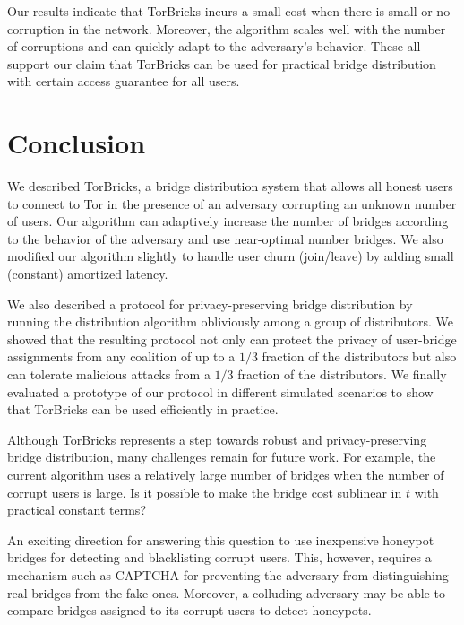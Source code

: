 \documentclass{sig-alternate-05-2015}
\newcommand{\bricks}{}
\def\bricks/{\mbox{TorBricks}}
\begin{document}
Our results indicate that \bricks/ incurs a small cost when there is small or no corruption in the network. Moreover, the algorithm scales well with the number of corruptions and can quickly adapt to the adversary's behavior. These all support our claim that \bricks/ can be used for practical bridge distribution with certain access guarantee for all users.

\section{Conclusion} \label{sec:conclusion}
We described \bricks/, a bridge distribution system that allows all honest users to connect to Tor in the presence of an adversary corrupting an unknown number of users. Our algorithm can adaptively increase the number of bridges according to the behavior of the adversary and use near-optimal number bridges. We also modified our algorithm slightly to handle user churn (join/leave) by adding small (constant) amortized latency.

We also described a protocol for privacy-preserving bridge distribution by running the distribution algorithm obliviously among a group of distributors. We showed that the resulting protocol not only can protect the privacy of user-bridge assignments from any coalition of up to a $1/3$ fraction of the distributors but also can tolerate malicious attacks from a $1/3$ fraction of the distributors. We finally evaluated a prototype of our protocol in different simulated scenarios to show that \bricks/ can be used efficiently in practice.

Although \bricks/ represents a step towards robust and privacy-preserving bridge distribution, many challenges remain for future work. For example, the current algorithm uses a relatively large number of bridges when the number of corrupt users is large. Is it possible to make the bridge cost sublinear in $t$ with practical constant terms? 

An exciting direction for answering this question to use inexpensive honeypot bridges for detecting and blacklisting corrupt users. This, however, requires a mechanism such as CAPTCHA for preventing the adversary from distinguishing real bridges from the fake ones. Moreover, a colluding adversary may be able to compare bridges assigned to its corrupt users to detect honeypots.
\end{document}
